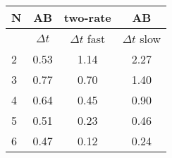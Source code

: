 \begin{tabular}{l|c|cc}
N & AB & two-rate& AB\\
\hline
 & $\Delta t$ & $\Delta t$ fast & $\Delta t$ slow\\
\hline
2 & 0.53& 1.14 & 2.27 \\
\hline
3 & 0.77& 0.70 & 1.40 \\
\hline
4 & 0.64& 0.45 & 0.90 \\
\hline
5 & 0.51& 0.23 & 0.46 \\
\hline
6 & 0.47& 0.12 & 0.24 \\
\hline
\end{tabular}
